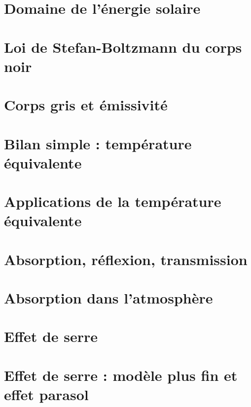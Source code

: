 \documentclass[
	a4paper,
	DIV16,
	10pt]{scrartcl}
\begin{document}
\section{Domaine de l'énergie solaire}


\newpage
\section{Loi de Stefan-Boltzmann du corps noir}


\newpage
\section{Corps gris et émissivité}


\newpage
\section{Bilan simple : température équivalente}



\newpage
\section{Applications de la température équivalente}


\newpage
\section{Absorption, réflexion, transmission}



\newpage
\section{Absorption dans l'atmosphère}



\newpage
\section{Effet de serre}


\newpage
\section{Effet de serre : modèle plus fin et effet parasol}

\end{document}
